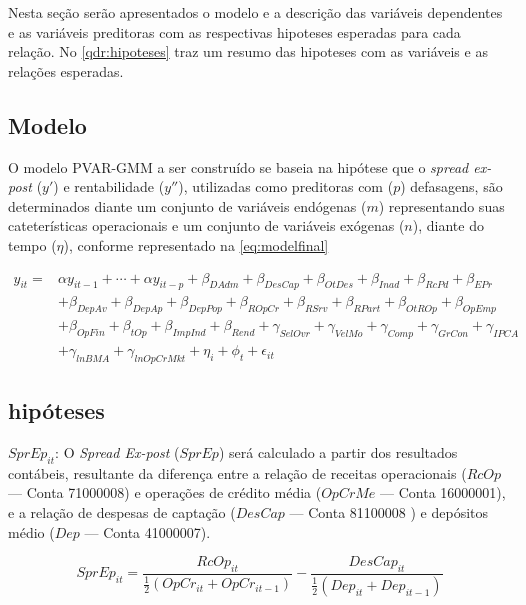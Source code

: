 \documentclass[
  12pt,
  12pt,
  openright,
  oneside,
  a4paper,
  chapter=TITLE,
  section=TITLE,
  subsection=TITLE,
  subsubsection=TITLE,
  english,
  portugues,
  sumario=tradicional]{abntex2}
\begin{document}
Nesta seção serão apresentados o modelo e a descrição das variáveis dependentes e as variáveis preditoras com as respectivas hipoteses esperadas para cada relação. No \autoref{qdr:hipoteses} traz um resumo das hipoteses com as variáveis e as relações esperadas.

\subsection{Modelo}

O modelo PVAR-GMM a ser construído se baseia na hipótese que o \emph{spread ex-post} (\(y'\)) e rentabilidade (\(y''\)), utilizadas como preditoras com (\(p\)) defasagens, são determinados diante um conjunto de variáveis endógenas (\(m\)) representando suas cateterísticas operacionais e um conjunto de variáveis exógenas (\(n\)), diante do tempo (\(\eta\)), conforme representado na \autoref{eq:modelfinal}

\begin{equation}\label{eq:modelfinal}
\begin{aligned}
y_{it} = & \alpha y_{it-1}+ \cdots +\alpha y_{it-p} + \beta_{DAdm} +  \beta_{DesCap} + \beta_{OtDes} + \beta_{Inad} + \beta_{RcPd} + \beta_{EPr} \\ 
& + \beta_{DepAv} + \beta_{DepAp} + \beta_{DepPop} + \beta_{ROpCr} + \beta_{RSrv} + \beta_{RPart} + \beta_{OtROp} + \beta_{OpEmp} \\
& + \beta_{OpFin} + \beta_{tOp} + \beta_{ImpInd} + \beta_{Rend} + \gamma_{SelOvr} + \gamma_{VelMo} + \gamma_{Comp} + \gamma_{GrCon} + \gamma_{IPCA}  \\ 
& + \gamma_{lnBMA} + \gamma_{lnOpCrMkt} + \eta_{i} + \phi_{t} + \epsilon_{it}   
\end{aligned}
\end{equation}

\subsection{hipóteses}

\(SprEp_{it}\): O \emph{Spread Ex-post} (\(SprEp\)) será calculado a partir dos resultados contábeis, resultante da diferença entre a relação de receitas operacionais (\(RcOp\) --- Conta 71000008) e operações de crédito média (\(OpCrMe\) --- Conta 16000001), e a relação de despesas de captação (\(DesCap\) --- Conta 81100008 ) e depósitos médio (\(Dep\) --- Conta 41000007).

\begin{equation}\label{eq:sprbase}
SprEp_{it} = \frac{RcOp_{it}}{\frac{1}{2}(OpCr_{it} + OpCr_{it-1}) } - \frac{DesCap_{it}}{\frac{1}{2}(Dep_{it} + Dep_{it-1})}
\end{equation}
\end{document}
